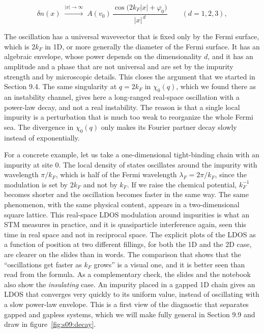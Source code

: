 \begin{equation}
\delta n(x) \;\xrightarrow{|x|\to\infty}\; A(v_0)\, \frac{\cos\!\big(2k_F |x| + \varphi_0\big)}{|x|^{\,d}} \qquad (d = 1,2,3),
\end{equation}

The oscillation has a universal wavevector that is fixed only by the Fermi surface, which is $2k_F$ in
1D, or more generally the diameter of the Fermi surface. It has an algebraic envelope, whose power
depends on the dimensionality $d$, and it has an amplitude and a phase that are not universal and are
set by the impurity strength and by microscopic details. This closes the argument that we started in
Section 9.4. The same singularity at $q=2k_F$ in $\chi_0(q)$, which we
found there as an instability channel, gives here a long-ranged real-space oscillation with a
power-law decay, and not a real instability. The reason is that a single local impurity is a
perturbation that is much too weak to reorganize the whole Fermi sea. The divergence in $\chi_0(q)$
only makes its Fourier partner decay slowly instead of exponentially.

For a concrete example, let us take a one-dimensional tight-binding chain with an impurity at site
$0$. The local density of states oscillates around the impurity with wavelength $\pi/k_F$, which is
half of the Fermi wavelength $\lambda_F=2\pi/k_F$, since the modulation is set by $2k_F$ and not by
$k_F$. If we raise the chemical potential, $k_F^{-1}$ becomes shorter and the oscillation becomes
faster in the same way. The same phenomenon, with the same physical content, appears in a
two-dimensional square lattice. This real-space LDOS modulation around impurities is what an STM
measures in practice, and it is quasiparticle interference again, seen this time in real space and
not in reciprocal space. The explicit plots of the LDOS as a function of position at two different
fillings, for both the 1D and the 2D case, are clearer on the slides than in words. The comparison
that shows that the ``oscillations get faster as $k_F$ grows'' is a visual one, and it is better seen than read from the
formula. As a complementary check, the slides and the
notebook also show the \emph{insulating} case. An impurity placed in a gapped 1D chain gives an LDOS
that converges very quickly to its uniform value, instead of oscillating with a slow power-law
envelope. This is a first view of the diagnostic that separates gapped and gapless systems, which we
will make fully general in Section 9.9 and draw in figure~\ref{fig:s09:decay}.

